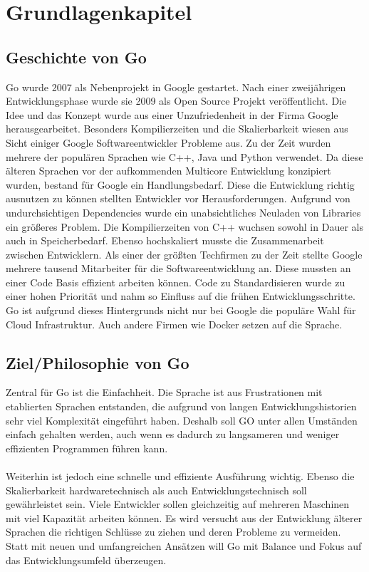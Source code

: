 \chapter{Grundlagenkapitel}\label{ch:data}

\section{Geschichte von Go}
Go wurde 2007 als Nebenprojekt in Google gestartet. Nach einer zweijährigen Entwicklungsphase wurde sie 2009 als Open Source Projekt veröffentlicht. Die Idee und das Konzept wurde aus einer Unzufriedenheit in der Firma Google herausgearbeitet. Besonders Kompilierzeiten und die Skalierbarkeit wiesen aus Sicht einiger Google Softwareentwickler Probleme aus. Zu der Zeit wurden mehrere der populären Sprachen wie C++, Java und Python verwendet. Da diese älteren Sprachen vor der aufkommenden Multicore Entwicklung konzipiert wurden, bestand für Google ein Handlungsbedarf. Diese die Entwicklung richtig ausnutzen zu können stellten Entwickler vor Herausforderungen. Aufgrund von undurchsichtigen Dependencies wurde ein unabsichtliches Neuladen von Libraries ein größeres Problem. Die Kompilierzeiten von C++ wuchsen sowohl in Dauer als auch in Speicherbedarf. Ebenso hochskaliert musste die Zusammenarbeit zwischen Entwicklern. Als einer der größten Techfirmen zu der Zeit stellte Google mehrere tausend Mitarbeiter für die Softwareentwicklung an. Diese mussten an einer Code Basis effizient arbeiten können. Code zu Standardisieren wurde zu einer hohen Priorität und nahm so Einfluss auf die frühen Entwicklungsschritte. Go ist aufgrund dieses Hintergrunds nicht nur bei Google die populäre Wahl für Cloud Infrastruktur. Auch andere Firmen wie Docker setzen auf die Sprache.\cite{cox_go_2022}
\cite{meyerson_go_2014}

\section{Ziel/Philosophie von Go}
Zentral für Go ist die Einfachheit. Die Sprache ist aus Frustrationen mit etablierten Sprachen entstanden, die aufgrund von langen Entwicklungshistorien sehr viel Komplexität eingeführt haben. Deshalb soll GO unter allen Umständen einfach gehalten werden, auch wenn es dadurch zu langsameren und weniger effizienten Programmen führen kann.\cite{donovan_go_2016}
\\\\Weiterhin ist jedoch eine schnelle und effiziente Ausführung wichtig. Ebenso die Skalierbarkeit hardwaretechnisch als auch Entwicklungstechnisch soll gewährleistet sein. Viele Entwickler sollen gleichzeitig auf mehreren Maschinen mit viel Kapazität arbeiten können. Es wird versucht aus der Entwicklung älterer Sprachen die richtigen Schlüsse zu ziehen und deren Probleme zu vermeiden. Statt mit neuen und umfangreichen Ansätzen will Go mit Balance und Fokus auf das Entwicklungsumfeld überzeugen.\cite{cox_go_2022}

